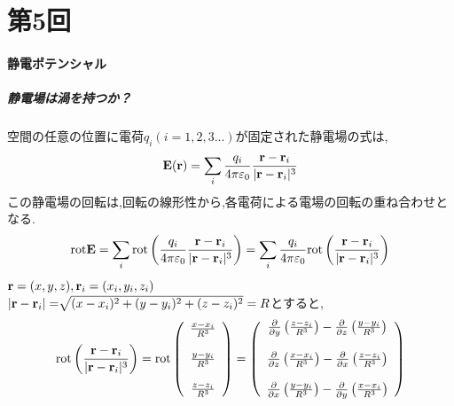 \documentclass[../main]{subfiles}
\begin{document}
\clearpage

\setcounter{eqnarray}{0}
\setcounter{equation}{0}
\setcounter{figure}{0}

\part*{第5回}

\subsection{静電ポテンシャル}
\subsubsection{静電場は渦を持つか？}
空間の任意の位置に電荷$q_i(i=1,2,3...)$が固定された静電場の式は,
\begin{eqnarray}
{\bf E}({\bf r})=\sum_i \frac{q_i}{4 \pi \varepsilon_0} \frac{{\bf r}-{\bf r}_i}{|{\bf r}-{\bf r}_i|^3}
\end{eqnarray}
この静電場の回転は,回転の線形性から,各電荷による電場の回転の重ね合わせとなる.
\begin{eqnarray}
{\rm rot}{\bf E} = \sum_i  {\rm rot} \left( \frac{q_i}{4 \pi \varepsilon_0} \frac{{\bf r}-{\bf r}_i}{|{\bf r}-{\bf r}_i|^3} \right) 
= \sum_i \frac{q_i}{4 \pi \varepsilon_0} {\rm rot} \left( \frac{{\bf r}-{\bf r}_i}{|{\bf r}-{\bf r}_i|^3} \right)
\end{eqnarray}
${\bf r}=(x,y,z), {\bf r}_i = (x_i,y_i,z_i)$ \\
$|{\bf r}-{\bf r}_i|=\sqrt[]{\mathstrut (x-x_i)^2+(y-y_i)^2+(z-z_i)^2}=R$とすると,
\begin{eqnarray}
{\rm rot}\left( \frac{{\bf r}-{\bf r}_i}{|{\bf r}-{\bf r}_i|^3} \right) =
{\rm rot}
\left( 
\begin{array}{cc}
\frac{x-x_i}{R^3} \\
\\
\frac{y-y_i}{R^3} \\
\\
\frac{z-z_i}{R^3} \\
\end{array}
\right)
=
\left( 
\begin{array}{cc}
\frac{\partial}{\partial y} \left( \frac{z-z_i}{R^3} \right) -\frac{\partial}{\partial z} \left( \frac{y-y_i}{R^3} \right) \\
\\
\frac{\partial}{\partial z} \left( \frac{x-x_i}{R^3} \right) -\frac{\partial}{\partial x} \left( \frac{z-z_i}{R^3} \right) \\
\\
\frac{\partial}{\partial x} \left( \frac{y-y_i}{R^3} \right) -\frac{\partial}{\partial y} \left( \frac{x-x_i}{R^3} \right) \\
\end{array}
\right)
\end{eqnarray}
\end{document}
